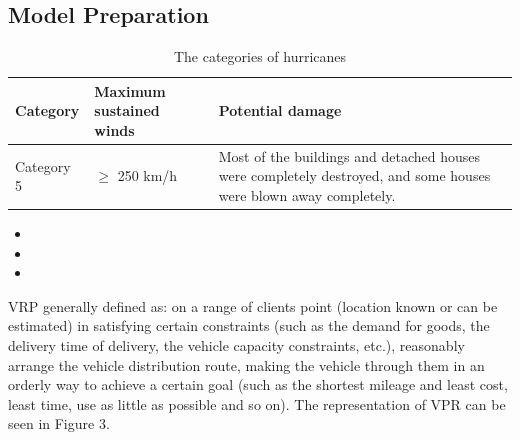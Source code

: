 \documentclass{mcmthesis}
\begin{document}
\subsection{Model Preparation}
\begin{table}[!ht]
\caption{The categories of hurricanes}
 \renewcommand\arraystretch{1.5}
 \setlength{\abovecaptionskip}{0pt}%
\setlength{\belowcaptionskip}{10pt}%
\begin{center}
\begin{tabular}{p{}p{}m{}}
\toprule[1.5pt]
Category& Maximum sustained winds & Potential damage \\
 \midrule

  Category 5 & $ \geq $ 250 km/h &   Most of the buildings and detached houses were completely destroyed, and some houses were blown away completely. \\  \bottomrule[1.5pt]
 \end{tabular}
 \end{center} 
 \end{table}
\begin{itemize}

\item 
\item 
\item \end{itemize}

VRP \cite{Dikas2016Solving,He2015Model} generally defined as: on a range of clients point (location known or can be estimated) in satisfying certain constraints (such as the demand for goods, the delivery time of delivery, the vehicle capacity constraints, etc.), reasonably arrange the vehicle distribution route, making the vehicle through them in an orderly way to achieve a certain goal (such as the shortest mileage and least cost, least time, use as little as possible and so on). The representation of VPR can be seen in Figure 3.
\end{document}
